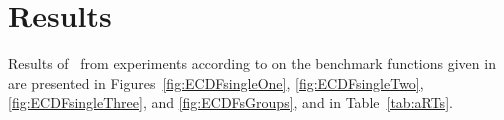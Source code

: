 \documentclass{sig-alternate}
\begin{document}

\section{Results}

Results of \algname\ from experiments according to \cite{biobj2016exp} on the benchmark
functions given in \cite{biobj2016func} are presented in
Figures~\ref{fig:ECDFsingleOne}, \ref{fig:ECDFsingleTwo}, \ref{fig:ECDFsingleThree}, and \ref{fig:ECDFsGroups}, and in
Table~\ref{tab:aRTs}.


\end{document}
